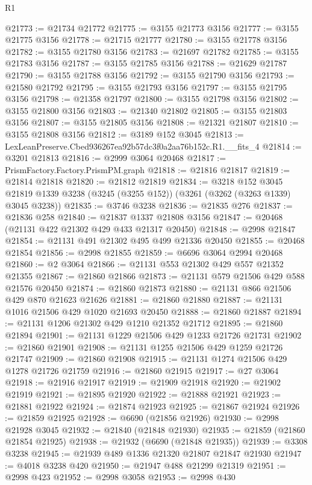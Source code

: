 \begin{lexlean}{R1}
\begin{coremodule}
@21773 := @21734 @21772
@21775 := @3155 @21773 @3156
@21777 := @3155 @21775 @3156
@21778 := @21715 @21777
@21780 := @3155 @21778 @3156
@21782 := @3155 @21780 @3156
@21783 := @21697 @21782
@21785 := @3155 @21783 @3156
@21787 := @3155 @21785 @3156
@21788 := @21629 @21787
@21790 := @3155 @21788 @3156
@21792 := @3155 @21790 @3156
@21793 := @21580 @21792
@21795 := @3155 @21793 @3156
@21797 := @3155 @21795 @3156
@21798 := @21358 @21797
@21800 := @3155 @21798 @3156
@21802 := @3155 @21800 @3156
@21803 := @21340 @21802
@21805 := @3155 @21803 @3156
@21807 := @3155 @21805 @3156
@21808 := @21321 @21807
@21810 := @3155 @21808 @3156
@21812 := @3189 @152 @3045
@21813 := LexLeanPreserve.Cbed936267ea92b57dc3f0a2aa76b152c.R1.__fits_4
@21814 := @3201 @21813
@21816 := @2999 @3064 @20468
@21817 := PrismFactory.Factory.PrismPM.graph
@21818 := @21816 @21817
@21819 := @21814 @21818
@21820 := @21812 @21819
@21834 := @3218
    @152
    @3045
    @21819
    @1339
    @3238
    (@3245 (@3255 @152))
    (@3261 (@3262 (@3263 @1339) @3045 @3238))
@21835 := @3746 @3238
@21836 := @21835 @276
@21837 := @21836 @258
@21840 := @21837 @1337 @21808 @3156
@21847 := @20468 (@21131 @422 @21302 @429 @433 @21317 @20450)
@21848 := @2998 @21847
@21854 := @21131 @491 @21302 @495 @499 @21336 @20450
@21855 := @20468 @21854
@21856 := @2998 @21855
@21859 := @6696 @3064 @2994 @20468
@21860 := @2 @3064
@21866 := @21131 @553 @21302 @429 @557 @21352 @21355
@21867 := @21860 @21866
@21873 := @21131 @579 @21506 @429 @588 @21576 @20450
@21874 := @21860 @21873
@21880 := @21131 @866 @21506 @429 @870 @21623 @21626
@21881 := @21860 @21880
@21887 := @21131 @1016 @21506 @429 @1020 @21693 @20450
@21888 := @21860 @21887
@21894 := @21131 @1206 @21302 @429 @1210 @21352 @21712
@21895 := @21860 @21894
@21901 := @21131 @1229 @21506 @429 @1233 @21726 @21731
@21902 := @21860 @21901
@21908 := @21131 @1255 @21506 @429 @1259 @21726 @21747
@21909 := @21860 @21908
@21915 := @21131 @1274 @21506 @429 @1278 @21726 @21759
@21916 := @21860 @21915
@21917 := @27 @3064
@21918 := @21916 @21917
@21919 := @21909 @21918
@21920 := @21902 @21919
@21921 := @21895 @21920
@21922 := @21888 @21921
@21923 := @21881 @21922
@21924 := @21874 @21923
@21925 := @21867 @21924
@21926 := @21859 @21925
@21928 := @6690 (@21856 @21926)
@21930 := @2998 @21928 @3045
@21932 := @21840 (@21848 @21930)
@21935 := @21859 (@21860 @21854 @21925)
@21938 := @21932 (@6690 (@21848 @21935))
@21939 := @3308 @3238
@21945 := @21939 @489 @1336 @21320 @21807 @21847 @21930
@21947 := @4018 @3238 @420
@21950 := @21947 @488 @21299 @21319
@21951 := @2998 @423
@21952 := @2998 @3058
@21953 := @2998 @430

\end{coremodule}
\end{lexlean}

